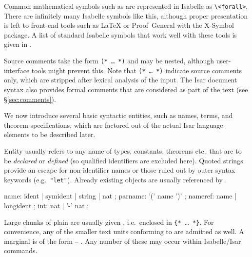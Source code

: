 \begin{isabellebody}
\begin{isamarkuptext}
  Common mathematical symbols such as \isa{{\isasymforall}} are represented in
  Isabelle as \verb,\<forall>,.  There are infinitely many Isabelle symbols
  like this, although proper presentation is left to front-end tools
  such as {\LaTeX} or Proof~General with the X-Symbol package.  A list
  of standard Isabelle symbols that work well with these tools is
  given in \cite[appendix~A]{isabelle-sys}.
  
  Source comments take the form \texttt{(*~\dots~*)} and may be
  nested, although user-interface tools might prevent this.  Note that
  \texttt{(*~\dots~*)} indicate source comments only, which are
  stripped after lexical analysis of the input.  The Isar document
  syntax also provides formal comments that are considered as part of
  the text (see \S\ref{sec:comments}).%
\end{isamarkuptext}%
\isamarkuptrue%
%
\isamarkuptrue%
%
\begin{isamarkuptext}%
We now introduce several basic syntactic entities, such as names,
  terms, and theorem specifications, which are factored out of the
  actual Isar language elements to be described later.%
\end{isamarkuptext}%
\isamarkuptrue%
%
\isamarkuptrue%
%
\begin{isamarkuptext}%
Entity  usually refers to any name of types,
  constants, theorems etc.\ that are to be \emph{declared} or
  \emph{defined} (so qualified identifiers are excluded here).  Quoted
  strings provide an escape for non-identifier names or those ruled
  out by outer syntax keywords (e.g.\ \verb|"let"|).  Already existing
  objects are usually referenced by .

  \begin{rail}
    name: ident | symident | string | nat
    ;
    parname: '(' name ')'
    ;
    nameref: name | longident
    ;
    int: nat | '-' nat
    ;
  \end{rail}%
\end{isamarkuptext}%
\isamarkuptrue%
%
\isamarkuptrue%
%
\begin{isamarkuptext}%
Large chunks of plain  are usually given
  , i.e.\ enclosed in
  \verb,{,\verb,*,~\dots~\verb,*,\verb,},.  For convenience, any of
  the smaller text units conforming to  are admitted
  as well.  A marginal  is of the form
  \texttt{--} .  Any number of these may occur within
  Isabelle/Isar commands.


\end{isamarkuptext}
\end{isabellebody}
